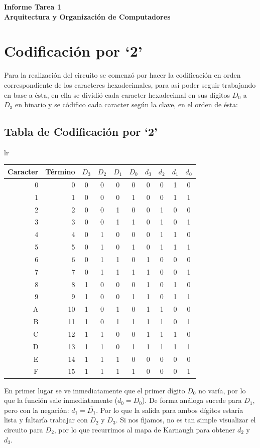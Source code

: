 \documentclass[11pt,letterpaper]{article}
\newcommand{\titulo}{Informe Tarea 1 \\ Arquitectura y Organización de Computadores}
\renewcommand{\maketitle}
{
\thispagestyle{fancy}
\begin{center}
\begin{Large}
\textbf{\titulo}\\
\end{Large}
\end{center}
\vspace{0.3cm}
}
\begin{document}
\setcounter{secnumdepth}{0}
\maketitle
\section{Codificación por `2'}
Para la realización del circuito se comenzó por hacer la codificación en orden correspondiente de los caracteres hexadecimales, para así poder seguir trabajando en base a ésta, en ella se dividió cada caracter hexadecimal en sus dígitos $D_0$ a $D_3$ en binario y se códifico cada caracter según la clave, en el orden de ésta:
\begin{center}
\subsection{Tabla de Codificación por `2'}
\vspace{0.2cm}
 \begin{tabular}{lr}
  \begin{tabular}[t]{r|r|cccc|cccc}
	Caracter&Término&$D_3$&$D_2$&$D_1$&$D_0$&$d_3$&$d_2$&$d_1$&$d_0$\\
	\hline
	0&0&0&0&0&0&		0&0&1&0\\
	1&1&0&0&0&1&		0&0&1&1\\
	2&2&0&0&1&0&		0&1&0&0\\
	3&3&0&0&1&1&		0&1&0&1\\
	4&4&0&1&0&0&		0&1&1&0\\
	5&5&0&1&0&1&		0&1&1&1\\
	6&6&0&1&1&0&		1&0&0&0\\
	7&7&0&1&1&1&		1&0&0&1\\
	8&8&1&0&0&0&		1&0&1&0\\
	9&9&1&0&0&1&		1&0&1&1\\
	A&10&1&0&1&0&		1&1&0&0\\
	B&11&1&0&1&1&		1&1&0&1\\
	C&12&1&1&0&0&		1&1&1&0\\
	D&13&1&1&0&1&		1&1&1&1\\
	E&14&1&1&1&0&		0&0&0&0\\
	F&15&1&1&1&1&		0&0&0&1\\
  \end{tabular}
  \end{tabular}
\end{center}
\vspace{0.2cm}
En primer lugar se ve inmediatamente que el primer dígito $D_0$ no varía, por lo que la función sale inmediatamente ($d_0 = D_0$). De forma análoga sucede para $D_1$, pero con la negación: $d_1 = \overline{D_1}$. Por lo que la salida para ambos dígitos estaría lista y faltaría trabajar con $D_2$ y $D_3$. Si nos fijamos, no es tan simple visualizar el circuito para $D_2$, por lo que recurrimos al mapa de Karnaugh para obtener $d_2$ y $d_3$.
\end{document}
